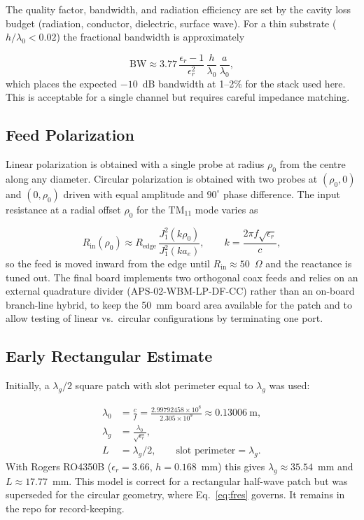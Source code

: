The quality factor, bandwidth, and radiation efficiency are set by the cavity loss budget (radiation, conductor, dielectric, surface wave). For a thin substrate ($h/\lambda_0 < 0.02$) the fractional bandwidth is approximately

\begin{equation}
    \mathrm{BW} \approx 3.77 \, \frac{\epsilon_r -1}{\epsilon_r^{2}} \, \frac{h}{\lambda_0} \, \frac{a}{\lambda_0} ,
\end{equation}
which places the expected $-10$~dB bandwidth at 1--2\% for the stack used here. This is acceptable for a single channel but requires careful impedance matching.

\subsection{Feed Polarization}

Linear polarization is obtained with a single probe at radius $\rho_0$ from the centre along any diameter. Circular polarization is obtained with two probes at $(\rho_0, 0)$ and $(0, \rho_0)$ driven with equal amplitude and $90^{\circ}$ phase difference. The input resistance at a radial offset $\rho_0$ for the $\mathrm{TM}_{11}$ mode varies as

\begin{equation}
    R_{\mathrm{in}}(\rho_0) \approx R_{\mathrm{edge}} \, \frac{J_1^{2}(k \rho_0)}{J_1^{2}(k a_e)},
    \qquad k = \frac{2\pi f \sqrt{\epsilon_r}}{c},
\end{equation}
so the feed is moved inward from the edge until $R_{\mathrm{in}} \approx 50$~$\Omega$ and the reactance is tuned out. The final board implements two orthogonal coax feeds and relies on an external quadrature divider (APS-02-WBM-LP-DF-CC) rather than an on-board branch-line hybrid, to keep the 50~mm board area available for the patch and to allow testing of linear vs.\ circular configurations by terminating one port.

\subsection{Early Rectangular Estimate}

Initially, a $\lambda_g/2$ square patch with slot perimeter equal to $\lambda_g$ was used:

\begin{align}
    \lambda_0 &= \frac{c}{f} = \frac{2.99792458\times10^{8}}{2.305\times10^{9}} \approx 0.13006~\mathrm{m}, \\
    \lambda_g &= \frac{\lambda_0}{\sqrt{\epsilon_r}}, \\
    L &= \lambda_g/2, \qquad \text{slot perimeter} = \lambda_g .
\end{align}
With Rogers RO4350B ($\epsilon_r=3.66$, $h=0.168$~mm) this gives $\lambda_g \approx 35.54$~mm and $L\approx 17.77$~mm. This model is correct for a rectangular half-wave patch but was superseded for the circular geometry, where Eq.~\ref{eq:fres} governs. It remains in the repo for record-keeping.

